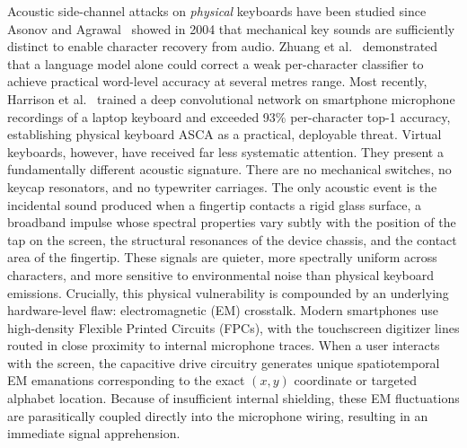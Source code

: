 \documentclass[conference]{IEEEtran}
\begin{document}
Acoustic side-channel attacks on \emph{physical} keyboards have
been studied since Asonov and Agrawal~\cite{asonov2004}
showed in 2004 that mechanical key sounds are sufficiently distinct
to enable character recovery from audio. Zhuang et
al.~\cite{zhuang2009keyboard} demonstrated that a language model
alone could correct a weak per-character classifier to achieve
practical word-level accuracy at several metres range.
Most recently, Harrison et al.~\cite{harrison2023deep} trained a deep convolutional network on smartphone microphone recordings of
a laptop keyboard and exceeded 93\% per-character top-1 accuracy,
establishing physical keyboard ASCA as a practical, deployable
threat. Virtual keyboards, however, have received far less systematic attention. They present a fundamentally different acoustic signature. There are no mechanical switches, no keycap resonators, and no typewriter carriages. The only acoustic event is the incidental sound produced when a fingertip contacts a rigid glass surface, a broadband impulse whose spectral properties vary subtly with the position of the tap on the screen, the structural resonances of the device chassis, and the contact area of the fingertip. These signals are quieter, more spectrally uniform across characters, and more sensitive to environmental noise than physical keyboard emissions. Crucially, this physical vulnerability is compounded by an underlying hardware-level flaw: electromagnetic (EM) crosstalk. Modern smartphones use high-density Flexible Printed Circuits (FPCs), with the touchscreen digitizer lines routed in close proximity to internal microphone traces. When a user interacts with the screen, the capacitive drive circuitry generates unique spatiotemporal EM emanations corresponding to the exact $(x, y)$ coordinate or targeted alphabet location. Because of insufficient internal shielding, these EM fluctuations are parasitically coupled directly into the microphone wiring, resulting in an immediate signal apprehension. 
\end{document}
